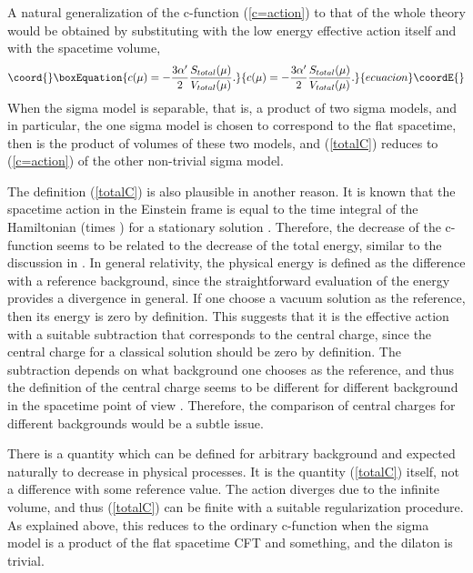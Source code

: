 \documentclass[a4paper,a4paper]{article}
\begin{document}
\vspace{3mm}

A natural generalization of the c-function (\ref{c=action}) to that of the whole theory would be obtained by 
substituting \coordHE{} with the low energy effective action itself and \coordHE{} with the spacetime volume,
\begin{equation}\coord{}\boxEquation{
c(\mu) = -\frac{3\alpha'}2\frac{S_{total}(\mu)}{V_{total}(\mu)}.
   \label{totalC}
}{
c(\mu) = -\frac{3\alpha'}2\frac{S_{total}(\mu)}{V_{total}(\mu)}.
   }{ecuacion}\coordE{}\end{equation}
When the sigma model is separable, that is, a product of two sigma models, and in particular, the one sigma model 
is chosen to correspond to the flat spacetime, then \coordHE{} is the product of volumes of these two models, 
and (\ref{totalC}) reduces to (\ref{c=action}) of the other non-trivial sigma model. 

The definition (\ref{totalC}) is also plausible in another reason. 
It is known that the spacetime action in the Einstein frame is equal to the time integral of the Hamiltonian 
(times \coordHE{}) for a stationary solution \cite{GR}. 
Therefore, the decrease of the c-function seems to be related to the decrease of the total energy, similar to the 
discussion in \cite{GHMS}. 
In general relativity, the physical energy is defined as the difference with a reference background, since the 
straightforward evaluation of the energy provides a divergence in general. 
If one choose a vacuum solution as the reference, then its energy is zero by definition. 
This suggests that it is the effective action with a suitable subtraction that corresponds to the central charge, 
since the central charge for a classical solution should be zero by definition. 
The subtraction depends on what background one chooses as the reference, and thus the definition of the 
central charge seems to be different for different background in the spacetime point of view . 
Therefore, the comparison of central charges for different backgrounds would be a subtle issue. 

\vspace{3mm}

There is a quantity which can be defined for arbitrary background and expected naturally to decrease in physical 
processes. 
It is the quantity (\ref{totalC}) itself, not a difference with some reference value. 
The action diverges due to the infinite volume, and thus (\ref{totalC}) can be finite with a suitable 
regularization procedure. 
As explained above, this reduces to the ordinary c-function when the sigma model is a product of the flat 
spacetime CFT and something, and the dilaton is trivial. 
\end{document}
